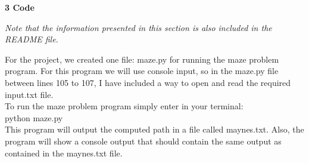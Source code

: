 \documentclass[12pt]{article}
\begin{document}
\vspace{0.2in}
\textbf{3 Code}

\emph{Note that the information presented in this section is also included in the README file.}

For the project, we created one file: maze.py for running the maze problem program. For this program we will use console input, so in the maze.py file between lines 105 to 107, I have included a way to open and read the required input.txt file. \\

To run the maze problem program simply enter in your terminal: \\

python maze.py \\

This program will output the computed path in a file called maynes.txt. Also, the program will show a console output that should contain the same output as contained in the maynes.txt file.

\nocite{textbook, networkx, python, python-time, discrete-textbook}

{}

\end{document}
